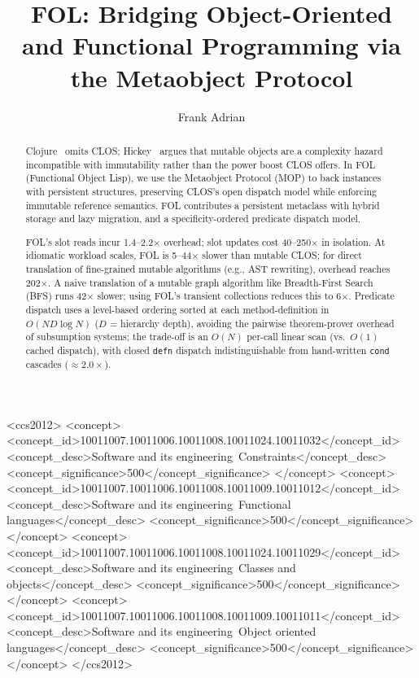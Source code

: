 \documentclass[sigconf,nonacm]{acmart}
\begin{document}

\title{FOL: Bridging Object-Oriented and Functional Programming via the Metaobject Protocol}

\author{Frank Adrian}

\begin{abstract}
Clojure~\cite{Hickey2008} omits CLOS; Hickey~\cite{Hickey2009} argues that
mutable objects are a complexity hazard incompatible with immutability rather
than the power boost CLOS offers.
In FOL (Functional Object Lisp), we use the Metaobject Protocol (MOP) to
back instances with persistent structures, preserving CLOS's open dispatch model
while enforcing immutable reference semantics.
FOL contributes a persistent metaclass with hybrid storage and lazy migration,
and a specificity-ordered predicate dispatch model.

FOL's slot reads incur 1.4--2.2$\times$ overhead; slot updates cost 40--250$\times$ in isolation.
At idiomatic workload scales, FOL is 5--44$\times$ slower than mutable CLOS; for direct translation of fine-grained mutable algorithms (e.g., AST rewriting), overhead reaches 202$\times$.
A naive translation of a mutable graph algorithm like Breadth-First Search (BFS) runs 42$\times$ slower; using FOL's transient collections reduces this to 6$\times$.
Predicate dispatch uses a level-based ordering sorted at each method-definition in $O(ND \log N)$ ($D$ = hierarchy depth), avoiding the pairwise theorem-prover overhead of subsumption systems;
the trade-off is an $O(N)$ per-call linear scan (vs.\ $O(1)$ cached dispatch), with closed \texttt{defn} dispatch indistinguishable from hand-written \texttt{cond} cascades (${\approx}2.0{\times}$).
\end{abstract}

\begin{CCSXML}
<ccs2012>
   <concept>
       <concept_id>10011007.10011006.10011008.10011024.10011032</concept_id>
       <concept_desc>Software and its engineering~Constraints</concept_desc>
       <concept_significance>500</concept_significance>
       </concept>
   <concept>
       <concept_id>10011007.10011006.10011008.10011009.10011012</concept_id>
       <concept_desc>Software and its engineering~Functional languages</concept_desc>
       <concept_significance>500</concept_significance>
       </concept>
   <concept>
       <concept_id>10011007.10011006.10011008.10011024.10011029</concept_id>
       <concept_desc>Software and its engineering~Classes and objects</concept_desc>
       <concept_significance>500</concept_significance>
       </concept>
   <concept>
       <concept_id>10011007.10011006.10011008.10011009.10011011</concept_id>
       <concept_desc>Software and its engineering~Object oriented languages</concept_desc>
       <concept_significance>500</concept_significance>
       </concept>
 </ccs2012>
\end{CCSXML}
\end{document}
